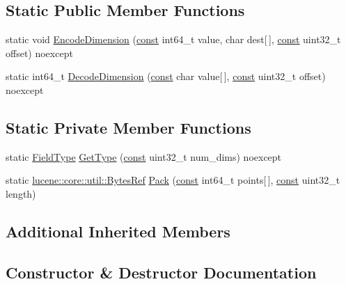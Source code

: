\subsection*{Static Public Member Functions}
\begin{DoxyCompactItemize}
\item 
static void \mbox{\hyperlink{classlucene_1_1core_1_1document_1_1LongPoint_a80f6cff17fd7eb5d8664650dda0174b0}{Encode\+Dimension}} (\mbox{\hyperlink{ZlibCrc32_8h_a2c212835823e3c54a8ab6d95c652660e}{const}} int64\+\_\+t value, char dest\mbox{[}$\,$\mbox{]}, \mbox{\hyperlink{ZlibCrc32_8h_a2c212835823e3c54a8ab6d95c652660e}{const}} uint32\+\_\+t offset) noexcept
\item 
static int64\+\_\+t \mbox{\hyperlink{classlucene_1_1core_1_1document_1_1LongPoint_ac98e9a6a591c5ed127d1330e2f5d5114}{Decode\+Dimension}} (\mbox{\hyperlink{ZlibCrc32_8h_a2c212835823e3c54a8ab6d95c652660e}{const}} char value\mbox{[}$\,$\mbox{]}, \mbox{\hyperlink{ZlibCrc32_8h_a2c212835823e3c54a8ab6d95c652660e}{const}} uint32\+\_\+t offset) noexcept
\end{DoxyCompactItemize}
\subsection*{Static Private Member Functions}
\begin{DoxyCompactItemize}
\item 
static \mbox{\hyperlink{classlucene_1_1core_1_1document_1_1FieldType}{Field\+Type}} \mbox{\hyperlink{classlucene_1_1core_1_1document_1_1LongPoint_a5c411f51ac0f3dbce1df139d3a4c1973}{Get\+Type}} (\mbox{\hyperlink{ZlibCrc32_8h_a2c212835823e3c54a8ab6d95c652660e}{const}} uint32\+\_\+t num\+\_\+dims) noexcept
\item 
static \mbox{\hyperlink{classlucene_1_1core_1_1util_1_1BytesRef}{lucene\+::core\+::util\+::\+Bytes\+Ref}} \mbox{\hyperlink{classlucene_1_1core_1_1document_1_1LongPoint_ae106b6585f35417b63c6f1f3aaeb1b93}{Pack}} (\mbox{\hyperlink{ZlibCrc32_8h_a2c212835823e3c54a8ab6d95c652660e}{const}} int64\+\_\+t points\mbox{[}$\,$\mbox{]}, \mbox{\hyperlink{ZlibCrc32_8h_a2c212835823e3c54a8ab6d95c652660e}{const}} uint32\+\_\+t length)
\end{DoxyCompactItemize}
\subsection*{Additional Inherited Members}


\subsection{Constructor \& Destructor Documentation}
\mbox{\label{classlucene_1_1core_1_1document_1_1LongPoint_afafac70472560f4063bc11afe18be5c7}} 
